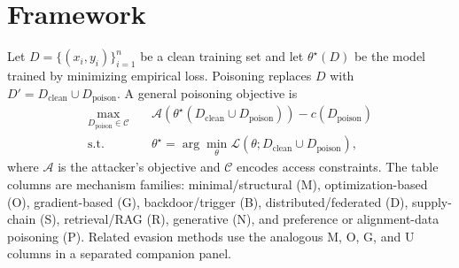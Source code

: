 ﻿\documentclass[6p,10pt,times]{ieeeaccess}
\begin{document}
\section{Framework}

Let \(D=\{(x_i,y_i)\}_{i=1}^{n}\) be a clean training set and let \(\theta^\star(D)\) be the model trained by minimizing empirical loss. Poisoning replaces \(D\) with \(D'=D_{\mathrm{clean}}\cup D_{\mathrm{poison}}\). A general poisoning objective is
\begin{equation}
\begin{aligned}
 \max_{D_{\mathrm{poison}}\in\mathcal{C}}\quad
   & \mathcal{A}(\theta^\star(D_{\mathrm{clean}}\cup D_{\mathrm{poison}}))
   - c(D_{\mathrm{poison}})\\
 \text{s.t.}\quad
   & \theta^\star=\arg\min_{\theta}\mathcal{L}(\theta;D_{\mathrm{clean}}\cup D_{\mathrm{poison}}),
\end{aligned}
\end{equation}
where \(\mathcal{A}\) is the attacker's objective and \(\mathcal{C}\) encodes access constraints. The table columns are mechanism families: minimal/structural (M), optimization-based (O), gradient-based (G), backdoor/trigger (B), distributed/federated (D), supply-chain (S), retrieval/RAG (R), generative (N), and preference or alignment-data poisoning (P). Related evasion methods use the analogous M, O, G, and U columns in a separated companion panel.
\end{document}
